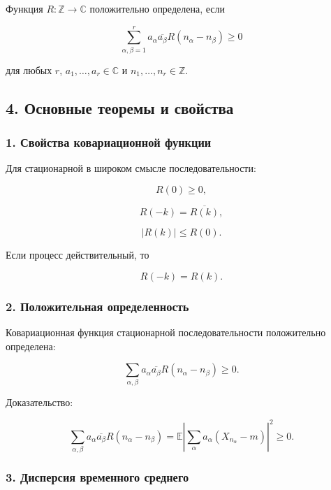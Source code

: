 \documentclass[
  11pt,
  a4paper,
]{article}
\begin{document}
Функция \(R:\mathbb Z\to\mathbb C\) положительно определена, если

\[
\sum_{\alpha,\beta=1}^r
a_\alpha\overline{a_\beta}R(n_\alpha-n_\beta)\ge0
\]

для любых \(r\), \(a_1,\ldots,a_r\in\mathbb C\) и
\(n_1,\ldots,n_r\in\mathbb Z\).

\subsection{4. Основные теоремы и
свойства}\label{ux43eux441ux43dux43eux432ux43dux44bux435-ux442ux435ux43eux440ux435ux43cux44b-ux438-ux441ux432ux43eux439ux441ux442ux432ux430}

\subsubsection{1. Свойства ковариационной
функции}\label{ux441ux432ux43eux439ux441ux442ux432ux430-ux43aux43eux432ux430ux440ux438ux430ux446ux438ux43eux43dux43dux43eux439-ux444ux443ux43dux43aux446ux438ux438}

Для стационарной в широком смысле последовательности:

\[
R(0)\ge0,
\]

\[
R(-k)=\overline{R(k)},
\]

\[
|R(k)|\le R(0).
\]

Если процесс действительный, то

\[
R(-k)=R(k).
\]

\subsubsection{2. Положительная
определенность}\label{ux43fux43eux43bux43eux436ux438ux442ux435ux43bux44cux43dux430ux44f-ux43eux43fux440ux435ux434ux435ux43bux435ux43dux43dux43eux441ux442ux44c}

Ковариационная функция стационарной последовательности положительно
определена:

\[
\sum_{\alpha,\beta}
a_\alpha\overline{a_\beta}R(n_\alpha-n_\beta)\ge0.
\]

Доказательство:

\[
\sum_{\alpha,\beta}
a_\alpha\overline{a_\beta}R(n_\alpha-n_\beta)
=
\mathbb E\left|
\sum_\alpha a_\alpha(X_{n_\alpha}-m)
\right|^2
\ge0.
\]

\subsubsection{3. Дисперсия временного
среднего}\label{ux434ux438ux441ux43fux435ux440ux441ux438ux44f-ux432ux440ux435ux43cux435ux43dux43dux43eux433ux43e-ux441ux440ux435ux434ux43dux435ux433ux43e}
\end{document}
